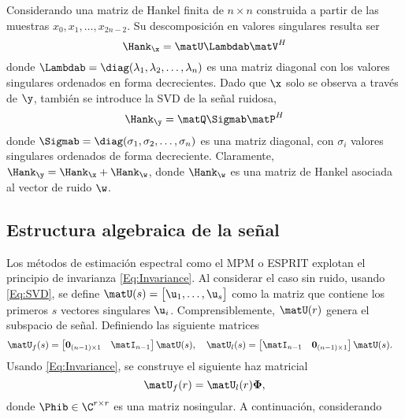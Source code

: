 Considerando una matriz de Hankel finita de $n\times n$ construida a partir de las muestras $x_0, x_1, \ldots, x_{2n-2}$. Su descomposición en valores singulares resulta ser
\begin{equation}
	\Hank_{\x} = \matU\Lambdab\matV^H
	\label{Eq:SVD}
\end{equation}
donde $\Lambdab = \diag(\lambda_1,\lambda_2,\ldots,\lambda_n)$ es una matriz diagonal con los valores singulares ordenados en forma decrecientes. Dado que $\x$ solo se observa a través de $\y$, también se introduce la SVD de la señal ruidosa,
\begin{equation}
	\Hank_{\y} = \matQ\Sigmab\matP^H
	\label{Eq:SVD_noisy}
\end{equation}
donde $\Sigmab = \diag(\sigma_1,\sigma_2,\ldots,\sigma_n)$ es una matriz diagonal, con $\sigma_i$ valores singulares ordenados de forma decreciente. Claramente, $\Hank_{\y} = \Hank_{\x} + \Hank_{\w}$, donde $\Hank_{\w}$ es una matriz de Hankel asociada al vector de ruido $\w$.

\subsection{Estructura algebraica de la señal}

Los métodos de estimación espectral como el MPM o ESPRIT \cite{Razavilar1998} explotan el principio de invarianza \eqref{Eq:Invariance}. Al considerar el caso sin ruido, usando \eqref{Eq:SVD}, se define $\matU(s) = \big[\u_1,\ldots,\u_s\big]$ como la matriz que contiene los primeros $s$ vectores singulares $\u_i$. Comprensiblemente, $\matU(r)$ genera el subspacio de señal. Definiendo las siguiente matrices
\begin{equation}
	\begin{aligned} 
		& \matU_f(s) = \begin{bmatrix} \mathbf{0}_{(n-1)\times 1} & \matI_{n-1}\end{bmatrix}\matU(s), \quad
		\matU_l(s) = \begin{bmatrix}  \matI_{n-1} & \mathbf{0}_{(n-1)\times 1} \end{bmatrix}\matU(s).
	\end{aligned}
	\label{Eq:matrices_lf}
\end{equation}
Usando \eqref{Eq:Invariance}, se construye el siguiente haz matricial
\begin{equation}
	\matU_f(r) = \matU_l(r)\boldsymbol{\Phi},
	\label{Um:eq}
\end{equation}
donde  $\Phib \in \C^{r \times r}$ es una matriz nosingular. A continuación, considerando

